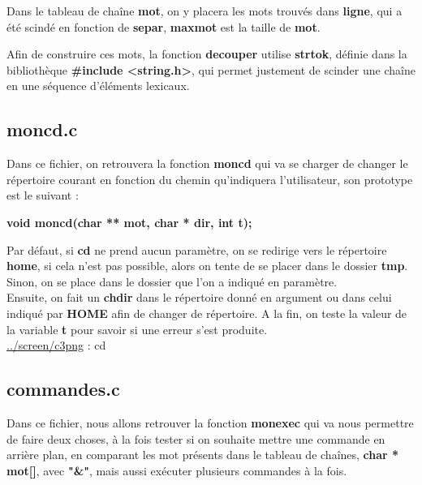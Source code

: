 \documentclass[11pt,a4paper]{report}
\begin{document}
Dans le tableau de chaîne \textbf{mot}, on y placera les mots trouvés dans \textbf{ligne}, qui a été scindé en fonction de \textbf{separ}, \textbf{maxmot} est la taille de \textbf{mot}.\newline

Afin de construire ces mots, la fonction \textbf{decouper} utilise \textbf{strtok}, définie dans la bibliothèque \textbf{#include <string.h>}, qui permet justement de scinder une chaîne en une séquence d'éléments lexicaux.

\newpage
\subsection{moncd.c\\}

Dans ce fichier, on retrouvera la fonction \textbf{moncd} qui va se charger de changer le répertoire courant en fonction du chemin qu'indiquera l'utilisateur, son prototype est le suivant :\newline

\textbf{void moncd(char ** mot, char * dir, int t);}\newline

Par défaut, si \textbf{cd} ne prend aucun paramètre, on se redirige vers le répertoire \textbf{home}, si cela n'est pas possible, alors on tente de se placer dans le dossier \textbf{tmp}.\newline \\ Sinon, on se place dans le dossier que l'on a indiqué en paramètre.\newline \\ Ensuite, on fait un \textbf{chdir} dans le répertoire donné en argument ou dans celui indiqué par \textbf{HOME} afin de changer de répertoire. A la fin, on teste la valeur de la variable \textbf{t} pour savoir si une erreur s'est produite.\newline \\
\href{../screen/c3.png}{../screen/c3png} : cd

\newpage
\subsection{commandes.c\\}

Dans ce fichier, nous allons retrouver la fonction \textbf{monexec} qui va nous permettre de faire deux choses, à la fois tester si on souhaite mettre une commande en arrière plan, en comparant les mot présents dans le tableau de chaînes, \textbf{char * mot[]}, avec \textbf{"&"}, mais aussi exécuter plusieurs commandes à la fois.\newline
\end{document}
